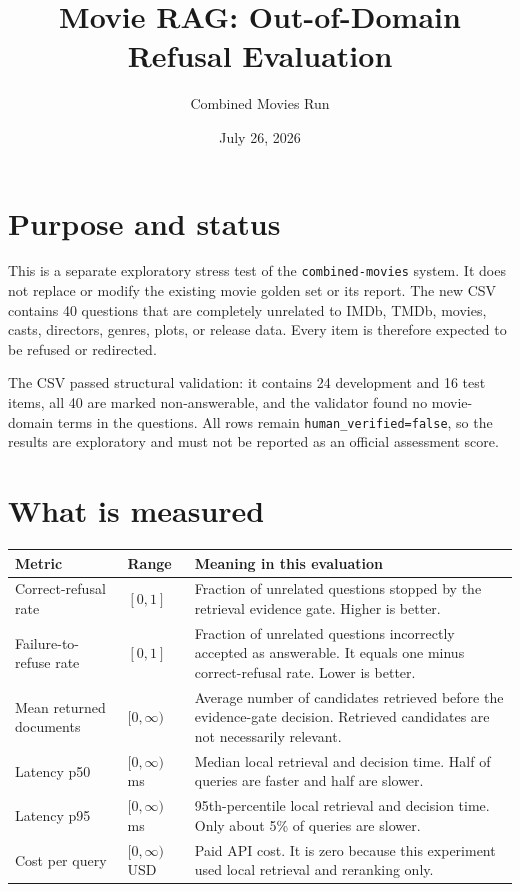 \documentclass[11pt]{article}
\title{Movie RAG: Out-of-Domain Refusal Evaluation}
\author{Combined Movies Run}
\date{July 26, 2026}
\begin{document}
\maketitle

\section{Purpose and status}

This is a separate exploratory stress test of the
\texttt{combined-movies} system. It does not replace or modify the existing
movie golden set or its report. The new CSV contains 40 questions that are
completely unrelated to IMDb, TMDb, movies, casts, directors, genres, plots,
or release data. Every item is therefore expected to be refused or redirected.

The CSV passed structural validation: it contains 24 development and 16 test
items, all 40 are marked non-answerable, and the validator found no
movie-domain terms in the questions. All rows remain
\texttt{human\_verified=false}, so the results are exploratory and must not be
reported as an official assessment score.

\section{What is measured}

\begin{longtable}{p{}p{}p{}}
\hline
Metric & Range & Meaning in this evaluation \\
\hline
Correct-refusal rate & $[0,1]$ & Fraction of unrelated questions stopped by the retrieval evidence gate. Higher is better. \\
Failure-to-refuse rate & $[0,1]$ & Fraction of unrelated questions incorrectly accepted as answerable. It equals one minus correct-refusal rate. Lower is better. \\
Mean returned documents & $[0,\infty)$ & Average number of candidates retrieved before the evidence-gate decision. Retrieved candidates are not necessarily relevant. \\
Latency p50 & $[0,\infty)$ ms & Median local retrieval and decision time. Half of queries are faster and half are slower. \\
Latency p95 & $[0,\infty)$ ms & 95th-percentile local retrieval and decision time. Only about 5\% of queries are slower. \\
Cost per query & $[0,\infty)$ USD & Paid API cost. It is zero because this experiment used local retrieval and reranking only. \\
\hline
\end{longtable}
\end{document}
